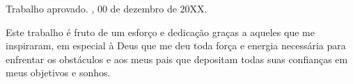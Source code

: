 \documentclass[
	12pt,				%
	openright,			%
	oneside,			%
	a4paper,			%
	english,			%
	french,				%
	spanish,			%
	brazil,				%
	]{abntex2}
\begin{document}
%
% 
%
\begin{folhadeaprovacao}

  \begin{center}
    {\ABNTEXchapterfont\large\imprimirautor}

    \vspace*{\fill}\vspace*{\fill}
    {\ABNTEXchapterfont\bfseries\Large\imprimirtitulo}
    \vspace*{\fill}
    
    \hspace{.45\textwidth}
    \begin{minipage}{.5\textwidth}
        \imprimirpreambulo
    \end{minipage}%
    \vspace*{\fill}
   \end{center}
    
   Trabalho aprovado. \imprimirlocal, 00 de dezembro de 20XX.

      
   \begin{center}
    \vspace*{0.5cm}
    {\large\imprimirlocal}
    \par
    {\large\imprimirdata}
    \vspace*{1cm}
  \end{center}
  
\end{folhadeaprovacao}


\begin{dedicatoria}
   \vspace*{\fill}
	\begin{flushright}
       Este trabalho é fruto de um esforço e dedicação graças a aqueles que me inspiraram, em especial à Deus que me deu toda força e energia necessária para enfrentar os obstáculos e aos meus pais que depositam todas suas confianças em meus objetivos e sonhos.
    \end{flushright}
\end{dedicatoria}
\end{document}
